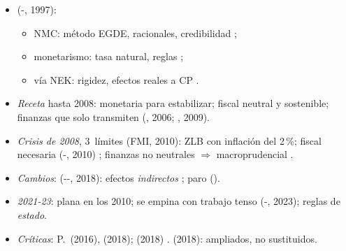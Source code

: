 \documentclass{article}
\begin{document}
\begin{columnas}
\begin{itemize}
\item {} (-, 1997):
  \begin{itemize}
  \item NMC: método EGDE, racionales, credibilidad ;
  \item monetarismo: tasa natural, reglas ;
  \item {} vía NEK: rigidez, efectos reales a CP .
  \end{itemize}
\item \emph{Receta} hasta 2008: monetaria para estabilizar; fiscal neutral y sostenible; finanzas que solo transmiten (, 2006; , 2009).
\item \emph{Crisis de 2008}, 3~límites (FMI, 2010): ZLB con inflación del 2\,\%; fiscal necesaria (-, 2010) ; finanzas no neutrales $\Rightarrow$ macroprudencial .
\item \emph{Cambios}:  (--, 2018): efectos \emph{indirectos} ; paro ().
\item \emph{2021-23}:  plana en los 2010; se empina con trabajo tenso (-, 2023); reglas de \emph{estado}.
\end{itemize}
\begin{itemize}
\item \emph{Críticas}: P.\, (2016),  (2018);  (2018) .  (2018): ampliados, no sustituidos.
\end{itemize}


\end{columnas}
\end{document}
